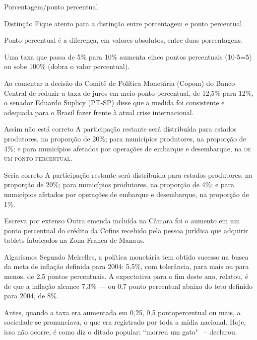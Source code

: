 \documentclass{if-beamer}
\begin{document}
	\begin{frame}[allowframebreaks]{Porcentagem/ponto percentual}
	
	\begin{block}{Distinção}
	 Fique atento para a distinção entre porcentagem e ponto percentual.

Ponto percentual é a diferença, em valores absolutos, entre duas porcentagens.
\framebreak

Uma taxa que passa de 5\% para 10\% aumenta cinco pontos percentuais (10-5=5) ou sobe 100\% (dobra o valor percentual).
\end{block}
	\framebreak
	\begin{block}{}
	Ao comentar a decisão do Comitê de Política Monetária (Copom) do Banco Central de reduzir a taxa de juros em meio 
	ponto percentual, de 12,5\% para 12\%, o senador Eduardo Suplicy (PT-SP) disse que a medida foi consistente e adequada 
	para o Brasil fazer frente à atual crise internacional. 
	\end{block}
	\framebreak
	\begin{block}{Assim não está correto}
	A participação restante será distribuída para estados produtores, na proporção de 20\%; para municípios produtores, 
	na proporção de 4\%; e para municípios afetados por operações de embarque e desembarque, na \textsc{de um ponto percentual}. 	
	\end{block}
	
	\framebreak
	
	\begin{block}{Seria correto}
	A participação restante será distribuída para estados produtores, na proporção de 20\%; para municípios produtores, na 
	proporção de 4\%; e para municípios afetados por operações de embarque e desembarque, na proporção de 1\%. 
	\end{block}
	
	\framebreak
	\begin{block}{Escreva por extenso}
	Outra emenda incluída na Câmara foi o aumento em um ponto percentual do crédito da Cofins recebido pela pessoa jurídica 
	que adquirir tablets fabricados na Zona Franca de Manaus. 
	\end{block}
	
	\framebreak
	\begin{block}{Algarismos}
	Segundo Meirelles, a política monetária tem obtido sucesso na busca da meta de inflação definida para 2004: 5,5\%, com
	 tolerância, para mais ou para menos, de 2,5 pontos percentuais. A expectativa para o fim deste ano, relatou, é de que
	  a inflação alcance 7,3\% — ou 0,7 ponto percentual abaixo do teto definido para 2004, de 8\%. 	
	\end{block}
	
	\framebreak
	
	\begin{block}{}
		Antes, quando a taxa era aumentada em 0,25, 0,5 pontopercentual ou mais, a sociedade se pronunciava, o que era
		 registrado por toda a mídia nacional. Hoje, isso não ocorre, é como diz o ditado popular: ``morreu um gato"~ -- declarou. 
	\end{block}
	
	\end{frame}
\end{document}
